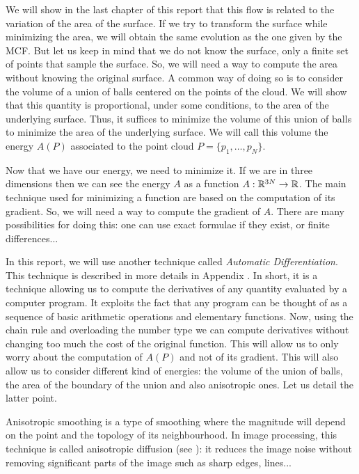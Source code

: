 We will show in the last chapter of this report that this flow is related to the
variation of the area of the surface. If we try to transform the surface while
minimizing the area, we will obtain the same evolution as the one given by the
MCF. But let us keep in mind that we do not know the surface, only a finite set
of points that sample the surface. So, we will need a way to compute the area
without knowing the original surface. A common way of doing so is to consider
the volume of a union of balls centered on the points of the cloud.  We will
show that this quantity is proportional, under some conditions, to the area of
the underlying surface. Thus, it suffices to minimize the volume of this union
of balls to minimize the area of the underlying surface. We will call this
volume the energy $ A(P) $ associated to the point cloud $ P = \{ p_1, \ldots,
p_N \} $.

Now that we have our energy, we need to minimize it. If we are in three
dimensions then we can see the energy $ A $ as a function $ A : \mathbb{R}^{3N} \to \mathbb{R}
$. The main technique used for minimizing a function are based on the
computation of its gradient. So, we will need a way to compute the gradient of $
A $. There are many possibilities for doing this: one can use exact formulae if
they exist, or finite differences...

In this report, we will use another technique called \textit{Automatic
    Differentiation}. This technique is described in more details in Appendix
. In short, it is a technique allowing us to compute
the derivatives of any quantity evaluated by a computer program. It exploits the
fact that any program can be thought of as a sequence of basic arithmetic
operations and elementary functions. Now, using the chain rule and overloading
the number type we can compute derivatives without changing too much the cost of
the original function.  This will allow us to only worry about the computation
of $ A(P) $ and not of its gradient. This will also allow us to consider
different kind of energies: the volume of the union of balls, the area of the
boundary of the union and also anisotropic ones. Let us detail the latter point.

Anisotropic smoothing is a type of smoothing where the magnitude will depend on
the point and the topology of its neighbourhood. In image processing, this
technique is called anisotropic diffusion (see \cite{weickert1998anisotropic}):
it reduces the image noise without removing significant parts of the image such
as sharp edges, lines...

